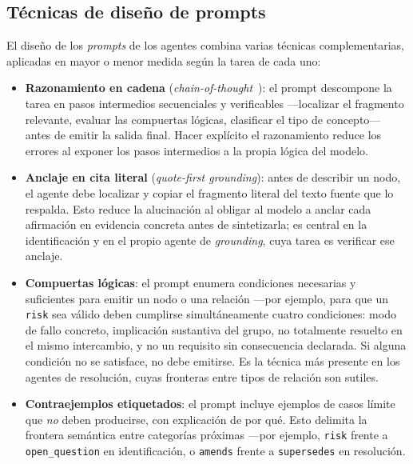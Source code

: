 \subsection{Técnicas de diseño de prompts}
\label{anx:tecnicas-prompts}

El diseño de los \textit{prompts} de los agentes combina varias técnicas complementarias, aplicadas
en mayor o menor medida según la tarea de cada uno:

\begin{itemize}
  \item \textbf{Razonamiento en cadena} (\textit{chain-of-thought}~\cite{wei2022cot}): el
        prompt descompone la tarea en pasos intermedios secuenciales y verificables —localizar
        el fragmento relevante, evaluar las compuertas lógicas, clasificar el tipo de concepto—
        antes de emitir la salida final. Hacer explícito el razonamiento reduce los errores
        al exponer los pasos intermedios a la propia lógica del modelo.

  \item \textbf{Anclaje en cita literal} (\textit{quote-first grounding}): antes de describir
        un nodo, el agente debe localizar y copiar el fragmento literal del texto fuente que lo
        respalda. Esto reduce la alucinación al obligar al modelo a anclar cada afirmación en
        evidencia concreta antes de sintetizarla; es central en la identificación y en el propio
        agente de \textit{grounding}, cuya tarea es verificar ese anclaje.

  \item \textbf{Compuertas lógicas}: el prompt enumera condiciones necesarias y suficientes
        para emitir un nodo o una relación —por ejemplo, para que un \texttt{risk} sea válido deben
        cumplirse simultáneamente cuatro condiciones: modo de fallo concreto, implicación sustantiva
        del grupo, no totalmente resuelto en el mismo intercambio, y no un requisito sin consecuencia
        declarada. Si alguna condición no se satisface, no debe emitirse. Es la técnica más presente
        en los agentes de resolución, cuyas fronteras entre tipos de relación son sutiles.

  \item \textbf{Contraejemplos etiquetados}: el prompt incluye ejemplos de casos límite que
        \emph{no} deben producirse, con explicación de por qué. Esto delimita la frontera
        semántica entre categorías próximas —por ejemplo, \texttt{risk} frente a
        \texttt{open\_question} en identificación, o \texttt{amends} frente a \texttt{supersedes}
        en resolución.


\end{itemize}
